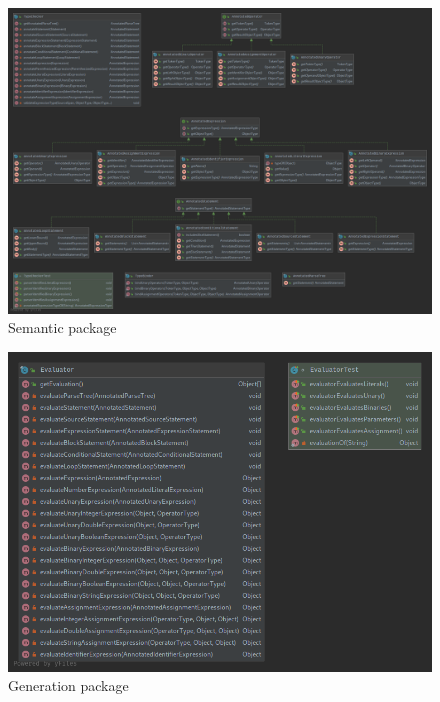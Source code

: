 \documentclass[
]{report}
\begin{document}
\begin{appendices}
\begin{figure}
		\includegraphics[width=\textwidth]{semantic-package-diagram}
		\caption{Semantic package}
		\label{fig:semantic-package-diagram}
	\end{figure}
	\begin{figure}
		\centering
		\includegraphics[width=\textwidth]{generation-package-diagram}
		\caption{Generation package}
		\label{fig:generation-package-diagram}
	\end{figure}
	\begin{figure}
		\centering

\end{figure}
\end{appendices}
\end{document}

